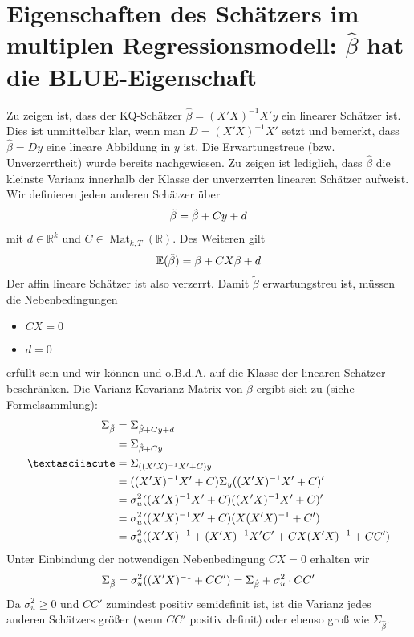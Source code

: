 \documentclass{article}
\newcommand{\E}{\mathbb{E}}
\DeclareMathOperator{\Mat}{Mat}
\begin{document}
	\section{Eigenschaften des Schätzers im multiplen Regressionsmodell: $\hat{\beta}$ hat die BLUE-Eigenschaft}
	Zu zeigen ist, dass der KQ-Schätzer $\hat{\beta}=(X'X)^{-1}X'y$ ein linearer Schätzer ist. Dies ist unmittelbar klar, wenn man $D=(X'X)^{-1}X'$ setzt und bemerkt, dass $\hat{\beta}=Dy$ eine lineare Abbildung in $y$ ist. Die Erwartungstreue (bzw. Unverzerrtheit) wurde bereits nachgewiesen. Zu zeigen ist lediglich, dass $\hat{\beta}$ die kleinste Varianz innerhalb der Klasse der unverzerrten linearen Schätzer aufweist. Wir definieren jeden anderen Schätzer über
	\begin{align}
		\tilde{\beta} = \hat{\beta} + Cy+d \notag
	\end{align}
	mit $d\in\mathbb{R}^k$ und $C\in\Mat_{k,T}(\mathbb{R})$. Des Weiteren gilt
	\begin{align}
		\E(\tilde{\beta}) = \beta + CX\beta + d \notag
	\end{align}
	Der affin lineare Schätzer ist also verzerrt. Damit $\tilde{\beta}$ erwartungstreu ist, müssen die Nebenbedingungen
	\begin{itemize}
		\item $CX=0$
		\item $d=0$
	\end{itemize}
	erfüllt sein und wir können und o.B.d.A. auf die Klasse der linearen Schätzer beschränken. Die Varianz-Kovarianz-Matrix von $\tilde{\beta}$ ergibt sich zu (siehe Formelsammlung):
	\begin{align}
		\Sigma_{\tilde{\beta}} &= \Sigma_{\hat{\beta} + Cy+d} \notag \\
		&= \Sigma_{\hat{\beta} + Cy} \notag \\´
		&= \Sigma_{((X'X)^{-1}X'+C)y} \notag \\
		&= ((X'X)^{-1}X'+C)\Sigma_y((X'X)^{-1}X'+C)' \notag \\
		&= \sigma_u^2((X'X)^{-1}X'+C)((X'X)^{-1}X'+C)' \notag \\
		&= \sigma_u^2((X'X)^{-1}X'+C)(X(X'X)^{-1}+C') \notag \\
		&= \sigma_u^2((X'X)^{-1} + (X'X)^{-1}X'C' + CX(X'X)^{-1} + CC') \notag
	\end{align}
	Unter Einbindung der notwendigen Nebenbedingung $CX=0$ erhalten wir
	\begin{align}
		\Sigma_{\tilde{\beta}} = \sigma_u^2((X'X)^{-1} + CC') = \Sigma_{\hat{\beta}} + \sigma_u^2\cdot CC' \notag
	\end{align}
	Da $\sigma_u^2\ge 0$ und $CC'$ zumindest positiv semidefinit ist, ist die Varianz jedes anderen Schätzers größer (wenn $CC'$ positiv definit) oder ebenso groß wie $\Sigma_{\hat{\beta}}$.
	
\end{document}
